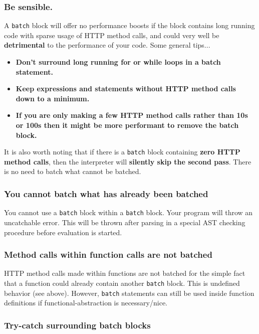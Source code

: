 \documentclass[12pt, letterpaper]{article}
\begin{document}
\subsubsection{Be sensible.}

A \verb|batch| block will offer no performance boosts if the block contains long running code with sparse usage of HTTP method calls, and could very well be \textbf{detrimental} to the performance of your code. Some general tips...

\begin{itemize}
    \item \textbf{Don't surround long running for or while loops in a batch statement.}
    \item \textbf{Keep expressions and statements without HTTP method calls down to a minimum.}
    \item \textbf{If you are only making a few HTTP method calls rather than 10s or 100s then it might be more performant to remove the batch block.}
\end{itemize}

It is also worth noting that if there is a \verb|batch| block containing \textbf{zero HTTP method calls}, then the interpreter will \textbf{silently skip the second pass}. There is no need to batch what cannot be batched.

\subsubsection{You cannot batch what has already been batched}

You cannot use a \verb|batch| block within a \verb|batch| block. Your program will throw an uncatchable error. This will be thrown after parsing in a special AST checking procedure before evaluation is started.

\subsubsection{Method calls within function calls are not batched}

HTTP method calls made within functions are not batched for the simple fact that a function could already contain another \verb|batch| block. This is undefined behavior (see above). However, \verb|batch| statements can still be used inside function definitions if functional-abstraction is necessary/nice.

\subsubsection{Try-catch surrounding batch blocks}
\end{document}
